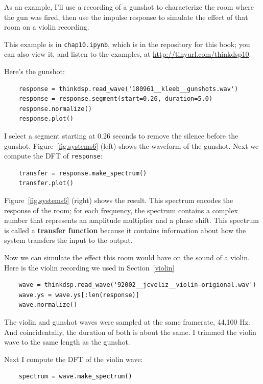 \documentclass[12pt]{book}
\begin{document}
As an example, I'll use a recording of a gunshot to characterize
the room where the gun was fired, then use the impulse response
to simulate the effect of that room on a violin recording.

This example is in {\tt chap10.ipynb}, which is in the repository
for this book; you can also view it, and listen to the examples,
at \url{http://tinyurl.com/thinkdsp10}.

Here's the gunshot:

\begin{verbatim}
    response = thinkdsp.read_wave('180961__kleeb__gunshots.wav')
    response = response.segment(start=0.26, duration=5.0)
    response.normalize()
    response.plot()
\end{verbatim}

I select a segment starting at 0.26 seconds to remove the silence
before the gunshot.  Figure~\ref{fig.systems6} (left) shows the
waveform of the gunshot.  Next we compute the DFT of {\tt response}:

\begin{verbatim}
    transfer = response.make_spectrum()
    transfer.plot()
\end{verbatim}

Figure~\ref{fig.systems6} (right) shows the result.  This spectrum
encodes the response of the room; for each frequency, the spectrum
contains a complex number that represents an amplitude multiplier and
a phase shift.  This spectrum is called a {\bf transfer
function} because it contains information about how the system transfers
the input to the output.

Now we can simulate the effect this room would have on the sound
of a violin.  Here is the violin recording we used in Section~\ref{violin}

\begin{verbatim}
    wave = thinkdsp.read_wave('92002__jcveliz__violin-origional.wav')
    wave.ys = wave.ys[:len(response)]
    wave.normalize()
\end{verbatim}

The violin and gunshot waves were sampled at the same framerate,
44,100 Hz.  And coincidentally, the duration of both is about the
same.  I trimmed the violin wave to the same length as the gunshot.

Next I compute the DFT of the violin wave:

\begin{verbatim}
    spectrum = wave.make_spectrum()
\end{verbatim}
\end{document}

